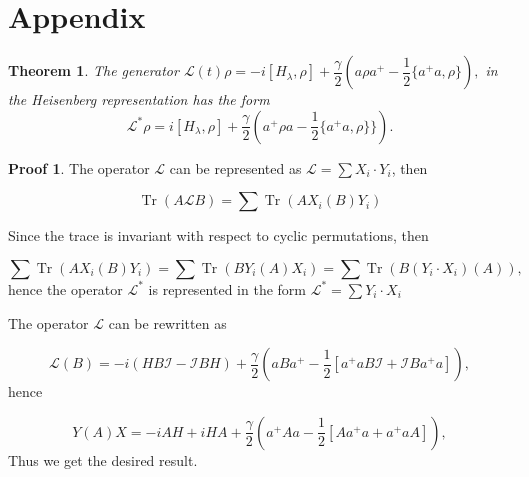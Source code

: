 \documentclass[12pt]{article}
\newtheorem{theorem}{Theorem}
\theoremstyle{definition}
\newtheorem*{demo}{Proof}
\newcommand\Tr{\operatorname{Tr}}
\def\ga {\gamma}
\def\la {\lambda}
\begin{document}
		
	\newpage
	\section{Appendix\label{App}}
	
	\begin{theorem}
		\label{th:HeiGenerator}
		The generator $\mathcal{L}(t)\rho = -i[H_{\lambda},\rho] + \dfrac{\ga}{2}(a\rho a^+ - \dfrac12\{a^+a,\rho\}),$ in the Heisenberg representation has the form 
		\begin{equation*}
			\mathcal{L}^*\rho = i[H_{\la},\rho]  + \dfrac{\ga}{2}(a^+\rho a - \dfrac{1}{2}\{a^+a,\rho\}\}).
		\end{equation*}
	\end{theorem}
	
	\begin{demo}
		The operator $\mathcal{L}$ can be represented as $\mathcal{L} = \sum X_i\cdot Y_i$, then 
		
		\begin{equation*}
			\Tr(A\mathcal{L}B) = \sum\Tr(AX_i(B)Y_i)
		\end{equation*}
		
		Since the trace is invariant with respect to cyclic permutations, then 	
		
		\begin{equation*}
			\sum\Tr(AX_i(B) Y_i) = \sum\Tr(B Y_i(A)X_i) = \sum\Tr(B(Y_i\cdot X_i)(A)),
		\end{equation*}
		hence the operator $\mathcal{L}^*$ is represented in the form $\mathcal{L}^* = \sum Y_i \cdot X_i$
		
		
		The operator $\mathcal{L}$ can be rewritten as
		
		\begin{equation*}
			\mathcal{L}(B) = -i(HB\mathcal{I} - \mathcal{I}B H) + \dfrac{\ga}{2}(aB a^+ - \dfrac{1}{2}[a^+aB\mathcal{I} + \mathcal{I}B a^+a]),
		\end{equation*}
		hence
		
		\begin{equation*}
			Y(A)X = -iAH + iHA + \dfrac{\ga}{2}(a^+Aa - \dfrac{1}{2}[Aa^+a + a^+aA]),	
		\end{equation*}
		Thus we get the desired result.
	\end{demo}
	
\end{document}

